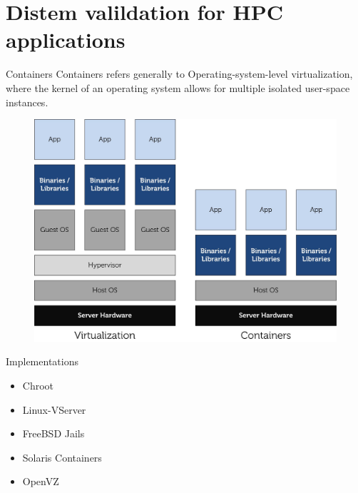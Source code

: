 \documentclass[11pt,xcolor=dvipsnames,presentation]{beamer}
\begin{document}
\section{Distem valildation for HPC applications}
\label{sec-3}
\begin{frame}[label=sec-3-0-1]{Containers}
\alert{Containers} refers generally to \alert{Operating-system-level virtualization},
 where the \alert{kernel} of an operating system allows for multiple isolated \alert{user-space instances}.

\begin{figure}[!h]
  \center
  \includegraphics[scale=0.65]{figures/lxc-vm.jpg}
  \label{fig:hpc}
\end{figure}
\end{frame}

\begin{frame}[label=sec-3-0-2]{Implementations}
\begin{itemize}
\item Chroot
\item Linux-VServer
\item FreeBSD Jails
\item Solaris Containers
\item OpenVZ
\end{itemize}
\end{frame}
\end{document}
